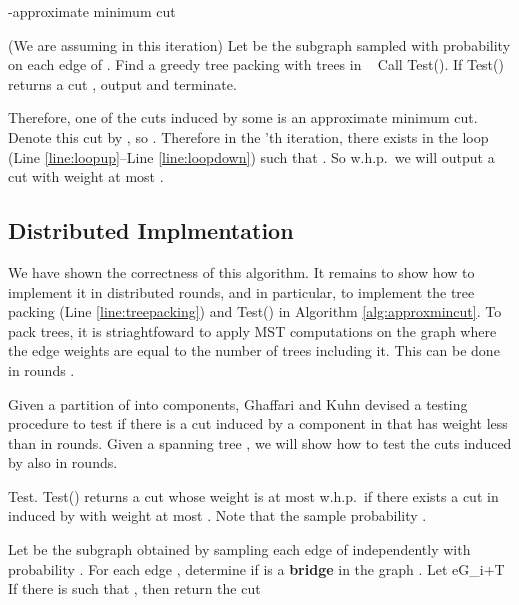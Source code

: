 \documentclass[11pt]{article}
\begin{document}
\begin{algorithm}[H]
\caption{-approximate minimum cut}
\begin{algorithmic}[1]\label{alg:approxmincut}
\STATE 
\STATE 
\REPEAT
\STATE 
\STATE (We are assuming  in this iteration)
\STATE Let  be the subgraph sampled with probability  on each edge of .
\STATE \label{line:treepacking}Find a greedy tree packing  with  trees in 
\
\STATE 
\REPEAT \label{line:loopup}
\STATE Call Test().
\STATE If Test() returns a cut , output  and terminate.
\ENDFOR
\STATE 
\UNTIL{} \label{line:loopdown}
\STATE 
\UNTIL{}
\end{algorithmic}
\end{algorithm}


Therefore, one of the cuts induced by some  is an  approximate minimum cut. Denote this cut by , so . Therefore in the 'th iteration, there exists  in the loop (Line \ref{line:loopup}--Line \ref{line:loopdown}) such that . So w.h.p.\ we will output a cut with weight at most .

\subsection{Distributed Implmentation}

We have shown the correctness of this algorithm. It remains to show how to implement it in  distributed rounds, and in particular, to implement the tree packing (Line \ref{line:treepacking}) and Test() in Algorithm \ref{alg:approxmincut}. To pack  trees, it is striaghtfoward to apply  MST computations on the graph where the edge weights are equal to the number of trees including it. This can be done in  rounds \cite{KP95}.

Given a partition  of  into components, Ghaffari and Kuhn \cite{GK13} devised a testing procedure to test if there is a cut induced by a component in  that has weight less than  in  rounds. Given a spanning tree , we will show how to test the  cuts induced by  also in  rounds. 

\begin{algorithm}[H]
\caption{Test. Test() returns a cut whose weight is at most  w.h.p.~if there exists a cut in  induced by  with weight at most . Note that the sample probability .}
\begin{algorithmic}[1]\label{alg:testing}
\FOR{}
	\STATE Let  be the subgraph obtained by sampling each edge of  independently with probability .
	\STATE For each edge , determine if  is a {\bf bridge} in the graph . \STATE Let eG_i+T
\ENDFOR
\STATE If there is  such that , then return the cut 
\end{algorithmic}
\end{algorithm}
\end{document}
